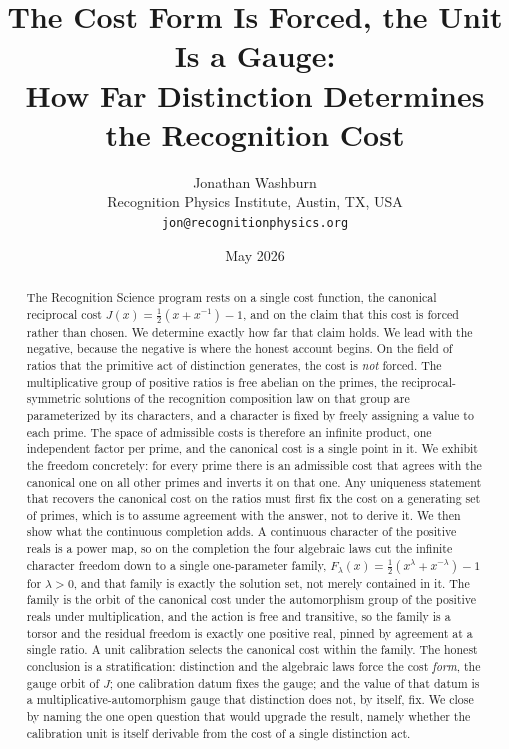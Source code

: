 \documentclass[11pt,a4paper]{article}
\title{%
  The Cost Form Is Forced, the Unit Is a Gauge:\\
  How Far Distinction Determines the Recognition Cost}
\author{%
  Jonathan Washburn\\
  Recognition Physics Institute, Austin, TX, USA\\
  \texttt{jon@recognitionphysics.org}}
\date{May 2026}
\theoremstyle{definition}
\theoremstyle{remark}
\newcommand{\costL}[1]{F_{#1}}
\begin{document}
\maketitle

\begin{abstract}\sloppy
The Recognition Science program rests on a single cost function, the canonical
reciprocal cost $J(x) = \tfrac{1}{2}(x + x^{-1}) - 1$, and on the claim that this
cost is forced rather than chosen. We determine exactly how far that claim
holds. We lead with the negative, because the negative is where the honest
account begins. On the field of ratios that the primitive act of distinction
generates, the cost is \emph{not} forced. The multiplicative group of positive
ratios is free abelian on the primes, the reciprocal-symmetric solutions of the
recognition composition law on that group are parameterized by its characters,
and a character is fixed by freely assigning a value to each prime. The space of
admissible costs is therefore an infinite product, one independent factor per
prime, and the canonical cost is a single point in it. We exhibit the freedom
concretely: for every prime there is an admissible cost that agrees with the
canonical one on all other primes and inverts it on that one. Any uniqueness
statement that recovers the canonical cost on the ratios must first fix the cost
on a generating set of primes, which is to assume agreement with the answer, not
to derive it. We then show what the continuous completion adds. A continuous
character of the positive reals is a power map, so on the completion the four
algebraic laws cut the infinite character freedom down to a single one-parameter
family, $\costL{\lambda}(x) = \tfrac{1}{2}(x^{\lambda} + x^{-\lambda}) - 1$ for
$\lambda > 0$, and that family is exactly the solution set, not merely contained
in it. The family is the orbit of the canonical cost under the automorphism
group of the positive reals under multiplication, and the action is free and
transitive, so the family is a torsor and the residual freedom is exactly one
positive real, pinned by agreement at a single ratio. A unit calibration selects
the canonical cost within the family. The honest conclusion is a stratification:
distinction and the algebraic laws force the cost \emph{form}, the gauge orbit of
$J$; one calibration datum fixes the gauge; and the value of that datum is a
multiplicative-automorphism gauge that distinction does not, by itself, fix. We
close by naming the one open question that would upgrade the result, namely
whether the calibration unit is itself derivable from the cost of a single
distinction act.
\end{abstract}
\end{document}
